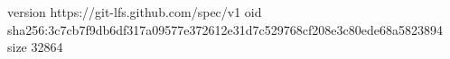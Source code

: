 version https://git-lfs.github.com/spec/v1
oid sha256:3c7cb7f9db6df317a09577e372612e31d7c529768cf208e3c80ede68a5823894
size 32864

